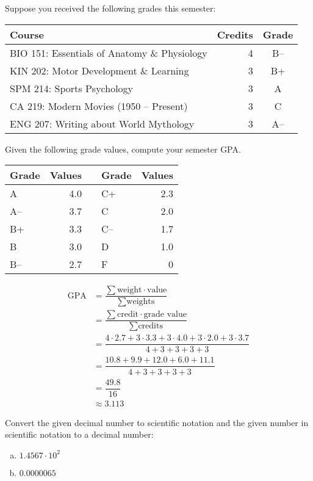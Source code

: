 \documentclass[12pt,letterpaper]{exam}
\begin{document}
\begin{questions}
\newpage
\question[5] Suppose you received the following grades this semester: \par
	\begin{table}[h]
	\centering
	\begin{tabular}{lrc}
	Course & Credits & Grade \\ \hline
	BIO 151: Essentials of Anatomy \& Physiology & 4 & B-- \\
	KIN 202: Motor Development \& Learning & 3 & B+ \\
	SPM 214: Sports Psychology & 3 & A\phantom{-} \\
	CA 219: Modern Movies (1950 -- Present) & 3 & C\phantom{-} \\
	ENG 207: Writing about World Mythology & 3 & A--
	\end{tabular}
	\end{table} \par
Given the following grade values, compute your semester GPA. 
	\begin{table}[h]
	\centering
	\begin{tabular}{lrclr}
	Grade & Values & & Grade & Values \\ \hline
	A & 4.0 & \hspace{1cm} & C+ & 2.3 \\
	A-- & 3.7 & & C & 2.0 \\
	B+ & 3.3 & & C-- & 1.7 \\
	B & 3.0 & & D & 1.0 \\
	B-- & 2.7 & & F & 0
	\end{tabular}
	\end{table} \pspace

\sol \pspace
	\[
	\begin{aligned}
	\text{GPA}&= \dfrac{\sum \text{weight} \cdot \text{value}}{\sum \text{weights}} \\[0.3cm]
	&= \dfrac{\sum \text{credit} \cdot \text{grade value}}{\sum \text{credits}} \\[0.3cm]
	&= \dfrac{4 \cdot 2.7 + 3 \cdot 3.3 + 3 \cdot 4.0 + 3 \cdot 2.0 + 3 \cdot 3.7}{4 + 3 + 3 + 3 + 3} \\[0.3cm]
	&= \dfrac{10.8 + 9.9 + 12.0 + 6.0 + 11.1}{4 + 3 + 3 + 3 + 3} \\[0.3cm]
	&= \dfrac{49.8}{16} \\[0.3cm]
	&\approx 3.113
	\end{aligned}
	\]



\newpage
\question[5] Convert the given decimal number to scientific notation and the given number in scientific notation to a decimal number:
	\begin{enumerate}[(a)]
	\item $1.4567 \cdot 10^2$
	\item $0.0000065$
	\end{enumerate} \pspace


\end{questions}
\end{document}
